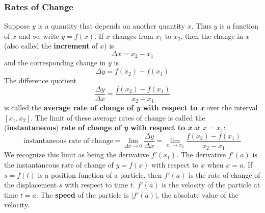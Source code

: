 \subsubsection*{Rates of Change}
Suppose \(y\) is a quantity that depends on another quantity \(x\).
Thus \(y\) is a function of \(x\) and we write \(y=f(x)\).
If \(x\) changes from \(x_1\) to \(x_2\),
then the change in \(x\) (also called the \textbf{increment} of \(x\)) is
\[\Delta x=x_2-x_1\]
and the corresponding change in \(y\) is
\[\Delta y=f(x_2)-f(x_1)\]
The difference quotient
\[\frac{\Delta y}{\Delta x}=\frac{f(x_2)-f(x_1)}{x_2-x_1}\]
is called the
\textbf{average rate of change of \textit{y} with respect to \textit{x}} over
the interval \([x_1,x_2]\).
The limit of these average rates of change is called the
(\textbf{instantaneous})
\textbf{rate of change of \textit{y} with respect to \textit{x}}
at \(x=x_1\):
\[\text{instantaneous rate of change}
=\lim_{\Delta x\to 0}\frac{\Delta y}{\Delta x}
=\lim_{x_1\to x_2}\frac{f(x_2)-f(x_1)}{x_2-x_1}\]
We recognize this limit as being the derivative \(f'(x_1)\).
The derivative \(f'(a)\) is the instantaneous rate of change of \(y=f(x)\)
with respect to \(x\) when \(x=a\).
If \(s=f(t)\) is a position function of a particle,
then \(f'(a)\) is the rate of change of the displacement \(s\) with respect to
time \(t\).
\(f'(a)\) is the velocity of the particle at time \(t=a\).
The \textbf{speed} of the particle is \(|f'(a)|\),
the absolute value of the velocity.